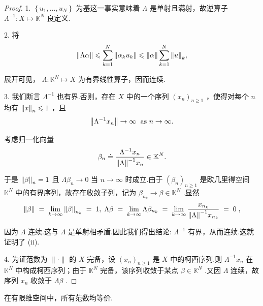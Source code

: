 \begin{proof}
1. $\left\{  {{u}_{1},\ldots ,{u}_{N}}\right\}$ 为基这一事实意味着 $\Lambda$ 是单射且满射，故逆算子 ${\Lambda }^{-1} : X \mapsto  {\mathbb{K}}^{N}$ 良定义.

2. 将
\[
\| {\Lambda \alpha }\|  \leqslant  \mathop{\sum }\limits_{{k = 1}}^{N}\norm{{\alpha }_{k}{u}_{k}} \leqslant  \| \alpha \| \mathop{\sum }\limits_{{k = 1}}^{N}\norm{u}_{k},
\]

展开可见， $\Lambda  : {\mathbb{K}}^{N} \mapsto  X$ 为有界线性算子，因而连续.

3. 我们断言 ${\Lambda }^{-1}$ 也有界.否则，存在 $X$ 中的一个序列 ${\left( {x}_{n}\right) }_{n \geq  1}$ ，使得对每个 $n$ 均有 $\norm{x}_{n} \leqslant  1$ ，且
\[
\norm{{\Lambda }^{-1}{x}_{n}} \rightarrow  \infty \;\text{ as }n \rightarrow  \infty .
\]

考虑归一化向量
\[
{\beta }_{n} \doteq  \frac{{\Lambda }^{-1}{x}_{n}}{\norm{\Lambda }^{-1}{x}_{n}} \in  {\mathbb{K}}^{N}.
\]

于是 $\norm{\beta }_{n} = 1$ 且 $\Lambda {\beta }_{n} \rightarrow  0$ 当 $n \rightarrow  \infty$ 时成立.由于 ${\left( {\beta }_{n}\right) }_{n \geq  1}$ 是欧几里得空间 ${\mathbb{K}}^{N}$ 中的有界序列，故存在收敛子列，记为 ${\beta }_{{n}_{k}} \rightarrow  \beta  \in  {\mathbb{K}}^{N}$ .显然
\[
\| \beta \| \; = \;\mathop{\lim }\limits_{{k \rightarrow  \infty }}\norm{\beta }_{{n}_{k}}\; = \;1,\;{\Lambda \beta }\; = \;\mathop{\lim }\limits_{{k \rightarrow  \infty }}\Lambda {\beta }_{{n}_{k}}\; = \;\mathop{\lim }\limits_{{k \rightarrow  \infty }}\frac{{x}_{{n}_{k}}}{\norm{\Lambda }^{-1}{x}_{{n}_{k}}}\; = \;0\;,
\]

因为 $\Lambda$ 连续.这与 $\Lambda$ 是单射相矛盾.因此我们得出结论: ${\Lambda }^{-1}$ 有界，从而连续.这就证明了 (ii).

4. 为证范数为 $\|  \cdot  \|$ 的 $X$ 完备，设 ${\left( {x}_{n}\right) }_{n \geq  1}$ 是 $X$ 中的柯西序列.则 ${\Lambda }^{-1}{x}_{n}$ 在 ${\mathbb{K}}^{N}$ 中构成柯西序列；由于 ${\mathbb{K}}^{N}$ 完备，该序列收敛于某点 $\beta  \in  {\mathbb{K}}^{N}$ .又因 $\Lambda$ 连续，故序列 ${x}_{n}$ 收敛于 ${\Lambda \beta }$ .
\end{proof}

\begin{corollary}[有限维空间中范数等价]
在有限维空间中，所有范数均等价.
\end{corollary}

